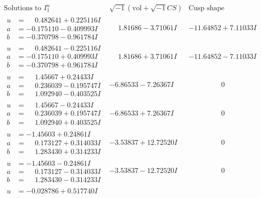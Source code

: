\documentclass[1p]{elsarticle_modified}
\theoremstyle{definition}
\newcommand{\I}{\sqrt{-1}}
\begin{document}
$$\begin{array}{c|c|c}
\text{Solutions to }I^u_{1}& \I (\text{vol} + \sqrt{-1}CS) & \text{Cusp shape}\\
 \hline 
\begin{aligned}
u &= \phantom{-}0.482641 + 0.225116 I \\
a &= -0.175110 - 0.409993 I \\
b &= -0.370798 - 0.961784 I\end{aligned}
 & \phantom{-}1.81686 - 3.71061 I & -11.64852 + 7.11033 I \\ \hline\begin{aligned}
u &= \phantom{-}0.482641 - 0.225116 I \\
a &= -0.175110 + 0.409993 I \\
b &= -0.370798 + 0.961784 I\end{aligned}
 & \phantom{-}1.81686 + 3.71061 I & -11.64852 - 7.11033 I \\ \hline\begin{aligned}
u &= \phantom{-}1.45667 + 0.24433 I \\
a &= \phantom{-}0.236039 - 0.195747 I \\
b &= \phantom{-}1.092940 - 0.403525 I\end{aligned}
 & -6.86533 - 7.26367 I & \phantom{-0.000000 } 0 \\ \hline\begin{aligned}
u &= \phantom{-}1.45667 - 0.24433 I \\
a &= \phantom{-}0.236039 + 0.195747 I \\
b &= \phantom{-}1.092940 + 0.403525 I\end{aligned}
 & -6.86533 + 7.26367 I & \phantom{-0.000000 } 0 \\ \hline\begin{aligned}
u &= -1.45603 + 0.24861 I \\
a &= \phantom{-}0.173127 + 0.314033 I \\
b &= \phantom{-}1.283430 + 0.314233 I\end{aligned}
 & -3.53837 + 12.72520 I & \phantom{-0.000000 } 0 \\ \hline\begin{aligned}
u &= -1.45603 - 0.24861 I \\
a &= \phantom{-}0.173127 - 0.314033 I \\
b &= \phantom{-}1.283430 - 0.314233 I\end{aligned}
 & -3.53837 - 12.72520 I & \phantom{-0.000000 } 0 \\ \hline\begin{aligned}
u &= -0.028786 + 0.517740 I \\

\end{aligned}
\end{array}$$
\end{document}
